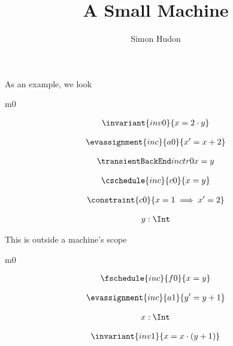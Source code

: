 \documentclass[12pt]{amsart}
\title{A Small Machine}
\author{Simon Hudon}
\date{} %
\begin{document}
\maketitle

As an example, we look

\begin{machine}{m0}


\begin{align*}
\invariant{inv0}
{	x = 2 \cdot y	}
\end{align*}

\begin{align*}
\evassignment{inc}{a0}
{	x' = x + 2	}
\end{align*}

\begin{align*}
\transient{inc}{0}{tr0}
{	x = y	}
\end{align*}

\begin{align*}
\cschedule{inc}{c0}
{	x = y	}
\end{align*}

\begin{align*}
\constraint{c0}
{	x = 1 \implies x' = 2	}
\end{align*}

\begin{align*}
\variable{	y: \Int}
\end{align*}

\end{machine}
This is outside a machine's scope

\begin{machine}{m0}

\begin{align*}
\fschedule{inc}{f0}
{	x = y	}
\end{align*}

\begin{align*}
\evassignment{inc}{a1}
{	y' = y + 1	}
\end{align*}

\begin{align*}
\variable{	x: \Int}
\end{align*}

\begin{align*}
\invariant{inv1}
{	x = x \cdot (y + 1)	}
\end{align*}


\end{machine}
\end{document}
